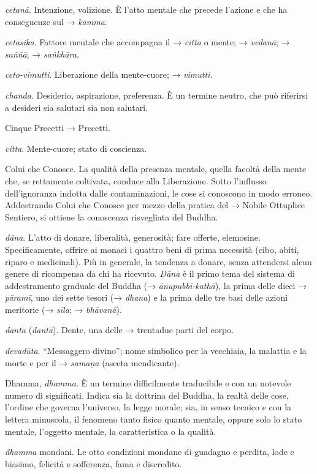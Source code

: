 \emph{cetanā}. Intenzione, volizione. È l'atto mentale che precede
l'azione e che ha conseguenze sul → \emph{kamma}.

\emph{cetasika}. Fattore mentale che accompagna il → \emph{citta} o
mente; → \emph{vedanā}; → \emph{saññā}; → \emph{saṅkhāra.}

\emph{ceto-vimutti}. Liberazione della mente-cuore; → \emph{vimutti.}

\emph{chanda}. Desiderio, aspirazione, preferenza. È un termine neutro,
che può riferirsi a desideri sia salutari sia non salutari.

Cinque Precetti → Precetti.

\emph{citta}. Mente-cuore; stato di coscienza.

Colui che Conosce. La qualità della presenza mentale, quella facoltà
della mente che, se rettamente coltivata, conduce alla Liberazione.
Sotto l'influsso dell'ignoranza indotta dalle contaminazioni, le cose si
conoscono in modo erroneo. Addestrando Colui che Conosce per mezzo della
pratica del → Nobile Ottuplice Sentiero, si ottiene la conoscenza
risvegliata del Buddha.

\emph{dāna}. L'atto di donare, liberalità, generosità; fare offerte,
elemosine. Specificamente, offrire ai monaci i quattro beni di prima
necessità (cibo, abiti, riparo e medicinali). Più in generale, la
tendenza a donare, senza attendersi alcun genere di ricompensa da chi ha
ricevuto. \emph{Dāna} è il primo tema del sistema di addestramento
graduale del Buddha (→ \emph{ānupubbī-kathā}), la prima delle dieci →
\emph{pāramī}, uno dei sette tesori (→ \emph{dhana}) e la prima delle
tre basi delle azioni meritorie (→ \emph{sīla}; → \emph{bhāvanā}).

\emph{danta} (\emph{dantā}). Dente, una delle → trentadue parti del
corpo.

\emph{devadūta}. ``Messaggero divino''; nome simbolico per la vecchiaia,
la malattia e la morte e per il → \emph{samaṇa} (asceta mendicante).

Dhamma, \emph{dhamma}. È un termine difficilmente traducibile e con un
notevole numero di significati. Indica sia la dottrina del Buddha, la
realtà delle cose, l'ordine che governa l'universo, la legge morale;
sia, in senso tecnico e con la lettera minuscola, il fenomeno tanto
fisico quanto mentale, oppure solo lo stato mentale, l'oggetto mentale,
la caratteristica o la qualità.

\emph{dhamma} mondani. Le otto condizioni mondane di guadagno e perdita,
lode e biasimo, felicità e sofferenza, fama e discredito.


